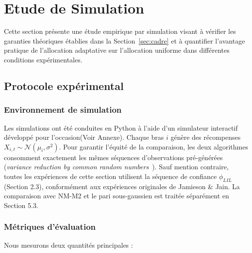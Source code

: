 \documentclass[10.5pt,a4paper]{article}
\begin{document}
\section{Etude de Simulation}
\label{sec:simulation}


Cette section présente une étude empirique par simulation visant à vérifier
les garanties théoriques établies dans la Section~\ref{sec:cadre} et à
quantifier l'avantage pratique de l'allocation adaptative sur l'allocation
uniforme dans différentes conditions expérimentales.

\subsection{Protocole expérimental}

\subsubsection{Environnement de simulation}

Les simulations ont été conduites en Python à l'aide d'un simulateur
interactif développé pour l'occasion(Voir Annexe). Chaque bras $i$ génère des
récompenses $X_{i,t} \sim \mathcal{N}(\mu_i, \sigma^2)$. Pour garantir
l'équité de la comparaison, les deux algorithmes consomment exactement
les mêmes séquences d'observations pré-générées (\textit{variance
reduction by common random numbers}~\cite{johari2022}). Sauf mention contraire, toutes les expériences de cette section utilisent la séquence de confiance $\phi_{LIL}$ (Section 2.3), conformément aux expériences originales de Jamieson & Jain. La comparaison avec NM-M2 et le pari sous-gaussien est traitée séparément en Section 5.3.

\subsubsection{Métriques d'évaluation}

Nous mesurons deux quantités principales :
\end{document}
